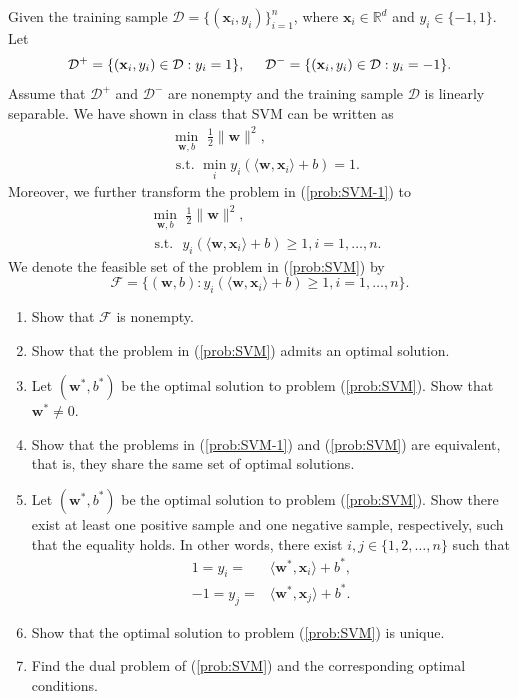 \documentclass[11pt,letter,notitlepage]{article}
\begin{document}
\begin{exercise}
Given the training sample $\mathcal{D}=\{ (\textbf{x}_i,y_i) \}_{i=1}^n$, where $\textbf{x}_i \in \mathbb{R}^d$ and $y_i \in \{ -1,1 \}$. Let 
\begin{align*}
    \mathcal{D}^+=\{(\textbf{x}_i,y_i)\in\mathcal{D}:y_i=1\},\hspace{5mm}\mathcal{D}^-=\{(\textbf{x}_i,y_i)\in\mathcal{D}:y_i=-1\}.
\end{align*}
Assume that $\mathcal{D}^+$ and $\mathcal{D}^-$ are nonempty and the training sample $\mathcal{D}$ is linearly separable. We have shown in class that SVM can be written as
\begin{align}\label{prob:SVM-1}
	&\min_{\textbf{w},b}\,\,\frac{1}{2}\| \textbf{w} \|^2, \\
	&\text{ s.t. } \min_i y_{i} ( \langle \textbf{w}, \textbf{x}_i \rangle + b ) = 1. \nonumber
\end{align}
Moreover, we further transform the problem in (\ref{prob:SVM-1}) to
\begin{align}\label{prob:SVM}
    	&\min_{\textbf{w},b}\,\,\frac{1}{2}\| \textbf{w} \|^2, \\
    	&\text{ s.t. }\,\, y_{i} ( \langle \textbf{w}, \textbf{x}_i \rangle + b ) \geq 1, i=1,\ldots,n. \nonumber
\end{align}
We denote the feasible set of the problem in (\ref{prob:SVM}) by $$\mathcal{F}=\{(\mathbf{w},b):y_{i} ( \langle \textbf{w}, \textbf{x}_i \rangle + b ) \geq 1, i=1,\ldots,n\}.$$

\begin{enumerate}
    \item Show that $\mathcal{F}$ is nonempty.
    \item Show that the problem in (\ref{prob:SVM}) admits an optimal solution.
    \item Let $(\textbf{w}^*,b^*)$ be the optimal solution to problem (\ref{prob:SVM}). Show that $\mathbf{w}^*\neq0$.
    \item Show that the problems in (\ref{prob:SVM-1}) and (\ref{prob:SVM}) are equivalent, that is, they share the same set of optimal solutions.
    \item Let $(\textbf{w}^*,b^*)$ be the optimal solution to problem (\ref{prob:SVM}). Show there exist at least one positive sample and one negative sample, respectively, such that the equality holds. In other words, there exist $i,j \in \{ 1,2,\dots,n \}$ such that 
    \begin{align*}
        1=y_i = &\langle \textbf{w}^*, \textbf{x}_i \rangle + b^*, \\
        -1=y_j = &\langle \textbf{w}^*, \textbf{x}_j \rangle + b^*.
    \end{align*}
    \item Show that the optimal solution to problem (\ref{prob:SVM}) is unique.
    \item Find the dual problem of (\ref{prob:SVM}) and the corresponding optimal conditions.
\end{enumerate}

\end{exercise}
\end{document}
